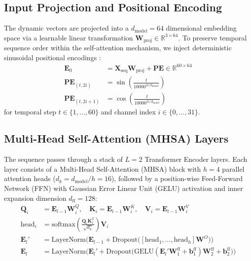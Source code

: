 \subsection{Input Projection and Positional Encoding}
The dynamic vectors are projected into a $d_{\text{model}} = 64$ dimensional embedding space via a learnable linear transformation $\mathbf{W}_{\text{proj}} \in \mathbb{R}^{3 \times 64}$. To preserve temporal sequence order within the self-attention mechanism, we inject deterministic sinusoidal positional encodings \cite{vaswani2017attention}:
\begin{align}
    \mathbf{E}_0 &= \mathbf{X}_{\text{seq}} \mathbf{W}_{\text{proj}} + \mathbf{PE} \in \mathbb{R}^{60 \times 64} \\
    \mathbf{PE}_{(t, 2i)} &= \sin\left(\frac{t}{10000^{2i/d_{\text{model}}}}\right) \\
    \mathbf{PE}_{(t, 2i+1)} &= \cos\left(\frac{t}{10000^{2i/d_{\text{model}}}}\right)
\end{align}
for temporal step $t \in \{1, \dots, 60\}$ and channel index $i \in \{0, \dots, 31\}$.

\subsection{Multi-Head Self-Attention (MHSA) Layers}
The sequence passes through a stack of $L = 2$ Transformer Encoder layers. Each layer consists of a Multi-Head Self-Attention (MHSA) block with $h = 4$ parallel attention heads ($d_k = d_{\text{model}} / h = 16$), followed by a position-wise Feed-Forward Network (FFN) with Gaussian Error Linear Unit (GELU) activation and inner expansion dimension $d_{\text{ff}} = 128$:
\begin{align}
    \mathbf{Q}_i &= \mathbf{E}_{l-1} \mathbf{W}_i^Q, \quad \mathbf{K}_i = \mathbf{E}_{l-1} \mathbf{W}_i^K, \quad \mathbf{V}_i = \mathbf{E}_{l-1} \mathbf{W}_i^V \\
    \text{head}_i &= \text{softmax}\left(\frac{\mathbf{Q}_i \mathbf{K}_i^T}{\sqrt{d_k}}\right) \mathbf{V}_i \\
    \mathbf{E}_l' &= \text{LayerNorm}\Big(\mathbf{E}_{l-1} + \text{Dropout}\big([\text{head}_1, \dots, \text{head}_h]\mathbf{W}^O\big)\Big) \\
    \mathbf{E}_l &= \text{LayerNorm}\Big(\mathbf{E}_l' + \text{Dropout}\big(\text{GELU}(\mathbf{E}_l' \mathbf{W}_1^{\text{ff}} + \mathbf{b}_1^{\text{ff}})\mathbf{W}_2^{\text{ff}} + \mathbf{b}_2^{\text{ff}}\big)\Big)
\end{align}

